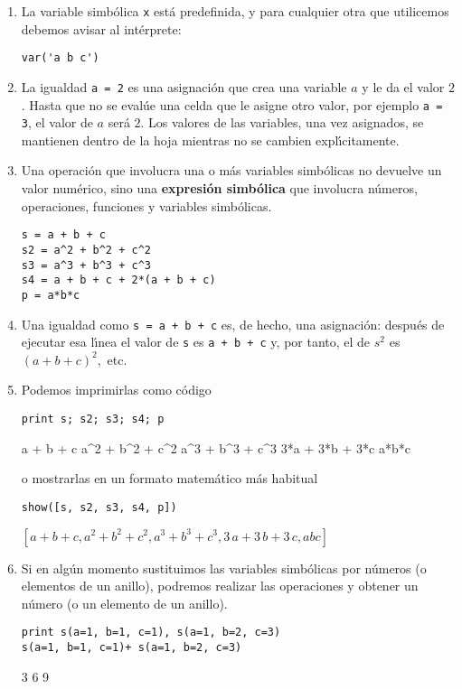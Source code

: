 \begin{enumerate}

\item La variable simbólica
\lstinline|x| está predefinida, y para cualquier otra que utilicemos
debemos
avisar al intérprete:
\begin{lstlisting}[numbers=none]
var('a b c')
\end{lstlisting}


\item La igualdad \lstinline|a = 2| es una asignaci\'on que crea
una variable $a$ y le da el valor $2$. Hasta que no se eval\'ue una celda que
le asigne otro valor, por ejemplo \lstinline|a = 3|, el valor de $a$
ser\'a $2$. Los valores de las variables, una vez asignados, se mantienen
dentro de la hoja mientras no se cambien expl\'{\i}citamente. 


\item Una operación que involucra una o más variables simbólicas no devuelve un
valor
numérico,
sino una \textbf{expresión simbólica} que involucra números, operaciones,
funciones y
variables simbólicas. 
\begin{lstlisting}[numbers=none]
s = a + b + c
s2 = a^2 + b^2 + c^2
s3 = a^3 + b^3 + c^3
s4 = a + b + c + 2*(a + b + c)
p = a*b*c
\end{lstlisting}
\item Una igualdad como \lstinline|s = a + b + c| es, de hecho, una
asignaci\'on: despu\'es de ejecutar esa l\'{\i}nea el valor de {\tt s} es
\lstinline|a + b + c| y, por tanto, el de $s^2$ es $(a+b+c)^2,$ etc. 


\item Podemos imprimirlas como código
\begin{lstlisting}[numbers=none]
print s; s2; s3; s4; p
\end{lstlisting}
\begin{Output}
	a + b + c
	a^2 + b^2 + c^2
	a^3 + b^3 + c^3
	3*a + 3*b + 3*c
	a*b*c
\end{Output}
 o mostrarlas en un formato matemático más habitual
\begin{lstlisting}[numbers=none]
show([s, s2, s3, s4, p])
\end{lstlisting}
\begin{Output}
	$\left[a + b + c, a^{2} + b^{2} + c^{2}, a^{3} + b^{3} + c^{3}, 3 \, a +
	3 \, b + 3 \, c, a b c\right]$
\end{Output}



\item Si en algún momento sustituimos las variables simbólicas por números
(o elementos de un anillo), podremos realizar las operaciones y obtener un
número (o un
elemento de un anillo).
\begin{lstlisting}[numbers=none]
print s(a=1, b=1, c=1), s(a=1, b=2, c=3)
s(a=1, b=1, c=1)+ s(a=1, b=2, c=3)
\end{lstlisting}
\begin{Output}
	3 6
	9
\end{Output}


\end{enumerate}
